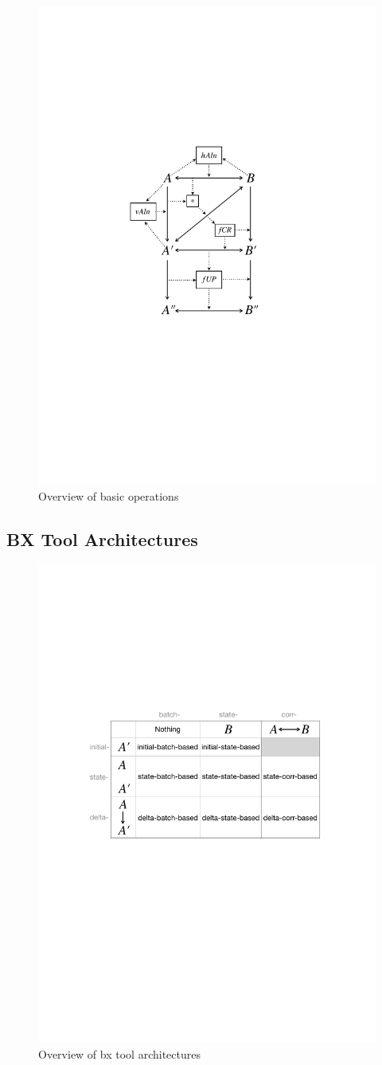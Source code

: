 \begin{figure}[tb!]
	\centering
	\includegraphics[width=0.55\columnwidth]{diagrams/BasicOperationsOverview}
	\caption{Overview of basic operations}
	\label{fig:basicOperationsOverview}
\end{figure}

\subsection{BX Tool Architectures}

\begin{figure}[tb!]
	\centering
	\includegraphics[width=0.9\columnwidth]{diagrams/ArchitectureLandscape}
	\caption{Overview of bx tool architectures}
	\label{fig:architectureLandscape}
\end{figure}


